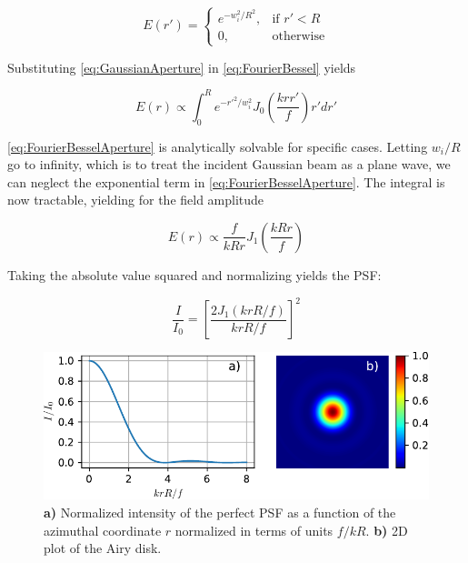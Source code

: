\begin{equation}\label{eq:GaussianAperture}
    E(r')=
    \begin{cases}
        e^{- w_i^2/R^2},& \text{if } r' < R\\
        0,               & \text{otherwise}
    \end{cases}
\end{equation}

Substituting \cref{eq:GaussianAperture} in \cref{eq:FourierBessel} yields

\begin{equation}\label{eq:FourierBesselAperture}
    E(r) \propto \int_0^R e^{-r'^2/w_i^2} J_0\left(\frac{k r r'}{f}\right)r'dr'
\end{equation}

\cref{eq:FourierBesselAperture} is analytically solvable for specific cases.
Letting $w_i/R$ go to infinity, which is to treat the incident Gaussian beam as a plane wave, we can neglect the exponential term in \cref{eq:FourierBesselAperture}. 
The integral is now tractable, yielding for the field amplitude

\begin{equation}\label{eq:AiryField}
    E(r) \propto \frac{f}{kRr} J_1\left(\frac{k R r}{f}\right)
\end{equation}

Taking the absolute value squared and normalizing yields the \ac{PSF}:

\begin{equation}\label{eq:NormalizedPSF}
    \frac{I}{I_0} = \left[
    \frac{2J_1(k r R/f)}{k r R/f}
    \right]^2
\end{equation}

\begin{figure}
    \centering
    \includegraphics[width = 0.8\linewidth]{figures/AiryDisk.pdf}
    \caption{\textbf{a)} Normalized intensity of the perfect \ac{PSF} as a function of the azimuthal coordinate $r$ normalized in terms of units $f / kR$.
    \textbf{b) }2D plot of the Airy disk.  }
    \label{fig:AiryPlots}
\end{figure}

